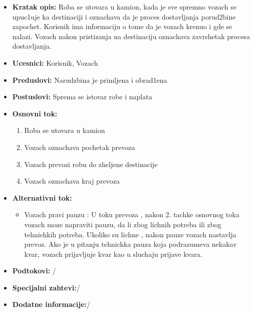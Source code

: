  \begin{itemize}
	\item {\textbf{Kratak opis:} Roba se utovara u kamion, kada je sve spremno vozach se upuc1uje ka destinaciji i oznachava da je proces dostavljanja porud2bine zapochet. Korisnik ima informaciju o tome da je vozach krenuo i gde se nalazi. Vozach nakon pristizanja na destinaciju oznachava zavrshetak procesa
		dostavljanja. }
	\item{\textbf{Ucesnici:} Korisnik, Vozach }
	\item{\textbf{Preduslovi:} Narudzbina je primljena i obrad1ena }
	\item{\textbf{Postuslovi:} Sprema se istovar robe i naplata}
	\item{\textbf{Osnovni tok:}  \begin{enumerate}
				\item {Roba se utovara u kamion}
				\item {Vozach oznachava pochetak prevoza}
				\item {Vozach prevozi robu do zheljene destinacije}
				\item {Vozach oznachava kraj prevoza}
	\end{enumerate}}
\item{\textbf{Alternativni tok:} 
	\begin{itemize}
		\item {Vozach pravi pauzu :
			   U toku prevoza , nakon 2. tachke osnovnog toka vozach moze napraviti pauzu, da li zbog lichnih potreba ili zbog tehnichkih potreba. Ukoliko su lichne , nakon pauze vozach nastavlja prevoz. Ako je u pitanju tehnichka pauza koja podrazumeva nekakav kvar, vozach prijavljuje kvar kao u sluchaju prijave kvara.}
	\end{itemize}}
\item{\textbf{Podtokovi:} /}
\item{\textbf{Specijalni zahtevi:}/}
\item{\textbf{Dodatne informacije:}/}
\end{itemize}




